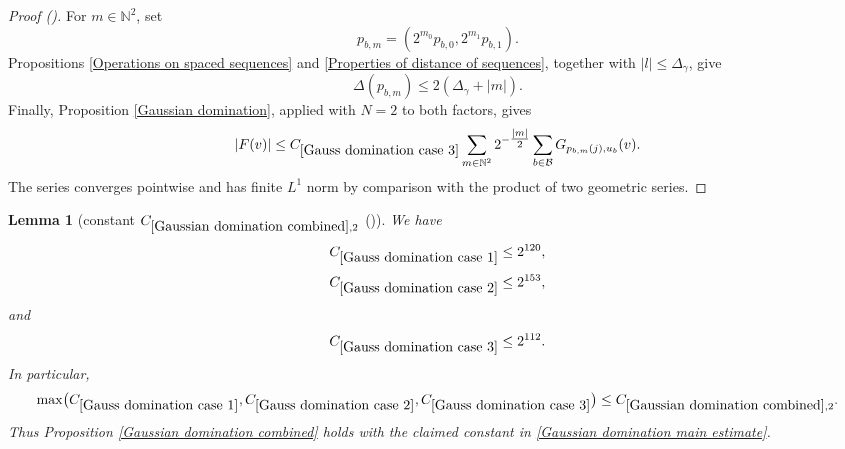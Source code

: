 \documentclass[12pt,reqno]{amsart}
\newcommand{\auto}{{({\tiny\faCar})}}
\theoremstyle{plain}
\newtheorem{lemma}[theorem]{Lemma}
\numberwithin{equation}{section}
\theoremstyle{remark}
\newcommand{\using}[1]{}
\newcommand{\N}{{\mathbb N}}
\begin{document}
\begin{proof}[Proof \auto]
For $m\in\N^2$, set
\[
p_{b,m}=(2^{m_0}p_{b,0},2^{m_1}p_{b,1}).
\]
Propositions \ref{Operations on spaced sequences} and
\ref{Properties of distance of sequences}, together with
$|l|\le\Delta_\gamma$, give
\[
\Delta(p_{b,m})
\le
2(\Delta_\gamma+|m|).
\]
Finally, Proposition \ref{Gaussian domination}, applied with $N=2$ to both factors, gives
\[
|F(v)|
\le
C_{\ref{Gauss domination case 3}}
\sum_{m\in\N^2}2^{-\tfrac{|m|}{2}}
\sum_{b\in\mathcal B}
G_{p_{b,m}(j),u_b}(v).
\]
The series converges pointwise and has finite $L^1$ norm by comparison with the product of two geometric series.

\medskip
\end{proof}

\begin{lemma}[constant $C_{\ref{Gaussian domination combined},2}$ \auto]\label{Gauss domination constant}\using{standard bump properties}\using{constant four scale Gaussian kernel}\using{constant mean four scale Gaussian kernel}\using{four scale Gaussian kernel}\using{mean four scale Gaussian kernel}\using{constant H kernel estimate Gaussian domination}\using{constant H kernel derivative estimate Gaussian domination}\using{H kernel estimate Gaussian domination}\using{H kernel derivative estimate Gaussian domination}\using{two bump estimate}\using{Gauss domination case 1}\using{Gauss domination case 2}\using{Gauss domination case 3}
We have
\begin{equation}\label{auto:Gaussian-domination-case-constant-bounds}
C_{\ref{Gauss domination case 1}}\le2^{120},
\end{equation}
\begin{equation}\label{auto:Gaussian-domination-case-two-constant-bound}
C_{\ref{Gauss domination case 2}}\le2^{153},
\end{equation}
and
\begin{equation}\label{auto:Gaussian-domination-case-three-constant-bound}
C_{\ref{Gauss domination case 3}}\le2^{112}.
\end{equation}
In particular,
\begin{equation}\label{auto:Gaussian-domination-common-constant-bound}
\max\bigl(C_{\ref{Gauss domination case 1}},C_{\ref{Gauss domination case 2}},C_{\ref{Gauss domination case 3}}\bigr)
\le C_{\ref{Gaussian domination combined},2}.
\end{equation}
Thus Proposition \ref{Gaussian domination combined} holds with the claimed constant in \eqref{Gaussian domination main estimate}.
\end{lemma}
\end{document}
